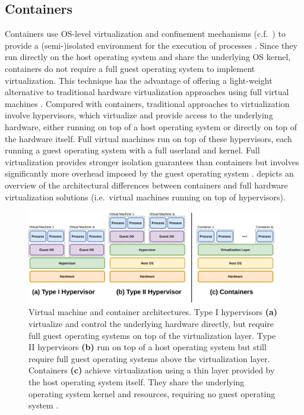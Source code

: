 \subsection{Containers}
\label{subsection:containers}

Containers use OS-level virtualization and confinement mechanisms (c.f.~) to provide a (semi-)isolated environment for the execution of processes \cite{sultan2019_container_security}. Since they run directly on the host operating system and share the underlying OS kernel, containers do not require a full guest operating system to implement virtualization. This technique has the advantage of offering a light-weight alternative to traditional hardware virtualization approaches using full virtual machines \cite{sultan2019_container_security}. Compared with containers, traditional approaches to virtualization involve hypervisors, which virtualize and provide access to the underlying hardware, either running on top of a host operating system or directly on top of the hardware itself. Full virtual machines run on top of these hypervisors, each running a guest operating system with a full userland and kernel. Full virtualization provides stronger isolation guarantees than containers but involves significantly more overhead imposed by the guest operating system \cite{sultan2019_container_security}.  depicts an overview of the architectural differences between containers and full hardware virtualization solutions (i.e.~virtual machines running on top of hypervisors).

\begin{figure}[htb]
  \centering
  \includegraphics[width=1\linewidth]{figs/virtualization.pdf}
  \caption{
    Virtual machine and container architectures. Type I hypervisors \textbf{(a)} virtualize and control the underlying hardware directly, but require full guest operating systems on top of the virtualization layer. Type II hypervisors \textbf{(b)} run on top of a host operating system but still require full guest operating systems above the virtualization layer. Containers \textbf{(c)} achieve virtualization using a thin layer provided by the host operating system itself. They share the underlying operating system kernel and resources, requiring no guest operating system \cite{sultan2019_container_security}.
  }%
  \label{fig:virt}
\end{figure}

